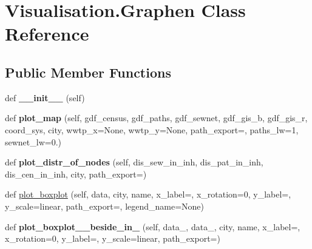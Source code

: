 \hypertarget{class_visualisation_1_1_graphen}{}\section{Visualisation.\+Graphen Class Reference}
\label{class_visualisation_1_1_graphen}
\subsection*{Public Member Functions}
\begin{DoxyCompactItemize}
\item 
\mbox{\label{class_visualisation_1_1_graphen_ac43842e2adbb2ee73a1d32d93cda2c60}} 
def {\bfseries \+\_\+\+\_\+init\+\_\+\+\_\+} (self)
\item 
\mbox{\label{class_visualisation_1_1_graphen_a6168707783a317dddfa9db33512c5710}} 
def {\bfseries plot\+\_\+map} (self, gdf\+\_\+census, gdf\+\_\+paths, gdf\+\_\+sewnet, gdf\+\_\+gis\+\_\+b, gdf\+\_\+gis\+\_\+r, coord\+\_\+sys, city, wwtp\+\_\+x=None, wwtp\+\_\+y=None, path\+\_\+export=\textquotesingle{}\textquotesingle{}, paths\+\_\+lw=1, sewnet\+\_\+lw=0.)
\item 
\mbox{\label{class_visualisation_1_1_graphen_a098dd0a59fc6a78ed04accf7bea85565}} 
def {\bfseries plot\+\_\+distr\+\_\+of\+\_\+nodes} (self, dis\+\_\+sew\+\_\+in\+\_\+inh, dis\+\_\+pat\+\_\+in\+\_\+inh, dis\+\_\+cen\+\_\+in\+\_\+inh, city, path\+\_\+export=\textquotesingle{}\textquotesingle{})
\item 
def \hyperlink{class_visualisation_1_1_graphen_a8a8fc5a2bc67e8e55cc6c9335448cd7a}{plot\+\_\+boxplot} (self, data, city, name, x\+\_\+label=\textquotesingle{}\textquotesingle{}, x\+\_\+rotation=0, y\+\_\+label=\textquotesingle{}\textquotesingle{}, y\+\_\+scale=\textquotesingle{}linear\textquotesingle{}, path\+\_\+export=\textquotesingle{}\textquotesingle{}, legend\+\_\+name=None)
\item 
\mbox{\label{class_visualisation_1_1_graphen_a2aeaee1afcd440b4f40f3b068ac6198a}} 
def {\bfseries plot\+\_\+boxplot\+\_\+\_\+beside\+\_\+in\+\_} (self, data\+\_, data\+\_, city, name, x\+\_\+label=\textquotesingle{}\textquotesingle{}, x\+\_\+rotation=0, y\+\_\+label=\textquotesingle{}\textquotesingle{}, y\+\_\+scale=\textquotesingle{}linear\textquotesingle{}, path\+\_\+export=\textquotesingle{}\textquotesingle{})

\end{DoxyCompactItemize}
